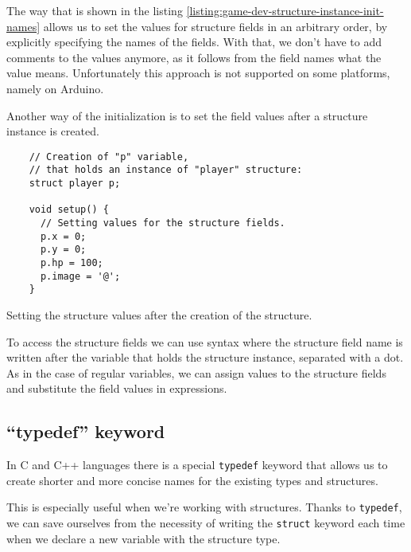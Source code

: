 \documentclass[../sparc.tex]{subfiles}
\begin{document}
The way that is shown in the listing
\ref{listing:game-dev-structure-instance-init-names} allows us to set the values
for structure fields in an arbitrary order, by explicitly specifying the names
of the fields.  With that, we don't have to add comments to the values anymore,
as it follows from the field names what the value means.  Unfortunately this
approach is not supported on some platforms, namely on Arduino.

Another way of the initialization is to set the field values after a structure
instance is created.

\begin{listing}[H]
  \begin{verbatim}
    // Creation of "p" variable,
    // that holds an instance of "player" structure:
    struct player p;

    void setup() {
      // Setting values for the structure fields.
      p.x = 0;
      p.y = 0;
      p.hp = 100;
      p.image = '@';
    }
  \end{verbatim}
  \caption{Setting the structure values after the creation of the structure.}
  \label{listing:game-dev-structure-assignment}
\end{listing}

To access the structure fields we can use syntax where the structure field name
is written after the variable that holds the structure instance, separated with
a dot.  As in the case of regular variables, we can assign values to the
structure fields and substitute the field values in expressions.

\subsection{``typedef'' keyword}

In C and C++ languages there is a special \texttt{typedef} keyword that
allows us to create shorter and more concise names for the existing types and
structures.

This is especially useful when we're working with structures.  Thanks to
\texttt{typedef}, we can save ourselves from the necessity of writing
the \texttt{struct} keyword each time when we declare a new variable
with the structure type.
\end{document}
